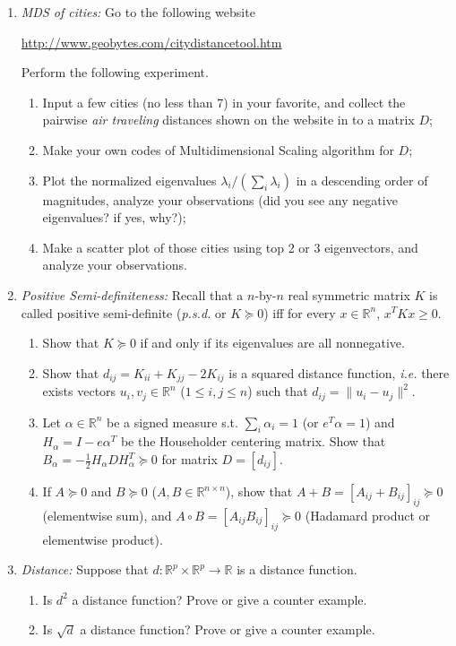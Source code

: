 \documentclass[11pt]{article}
\def\R{{\mathbb R}}
\begin{document}
\begin{enumerate}
\item {\em MDS of cities:} Go to the following website

\url{http://www.geobytes.com/citydistancetool.htm}

Perform the following experiment. 
\begin{enumerate}
\item Input a few cities (no less than 7) in your favorite, and collect the pairwise \emph{air traveling} distances shown on the website in to a matrix $D$;
\item Make your own codes of Multidimensional Scaling algorithm for $D$;
\item Plot the normalized eigenvalues $\lambda_i / (\sum_i \lambda_i)$ in a descending order of magnitudes, analyze your observations (did you see any negative eigenvalues? if yes, why?);
\item Make a scatter plot of those cities using top 2 or 3 eigenvectors, and analyze your observations. 
\end{enumerate}



\item {\em Positive Semi-definiteness:} Recall that a $n$-by-$n$ real symmetric matrix $K$ is called positive semi-definite (\emph{p.s.d.} or $K\succeq 0$) iff for every $x\in \R^n$, $x^T K x\geq 0$. 
\begin{enumerate}
\item Show that $K\succeq 0$ if and only if its eigenvalues are all nonnegative.
\item Show that $d_{ij}=K_{ii} + K_{jj} - 2 K_{ij}$ is a squared distance function, \emph{i.e.} there exists vectors $u_i,v_j \in \R^n$ ($1\leq i,j \leq n$) such that $d_{ij} = \|u_i - u_j\|^2$. 
\item Let $\alpha\in \R^n$ be a signed measure s.t. $\sum_i \alpha_i = 1$ (or $e^T \alpha =1$) and $H_\alpha= I - e \alpha^T$ be the Householder centering matrix. Show that $B_\alpha= - \frac{1}{2} H_\alpha D H_\alpha^T\succeq 0$ for matrix $D=[d_{ij}]$. 
\item If $A\succeq 0$ and $B\succeq 0$ ($A,B\in \R^{n\times n}$), show that $A+B = [A_{ij} + B_{ij}]_{ij} \succeq 0$ (elementwise sum), and $A\circ B= [A_{ij} B_{ij}]_{ij} \succeq 0$ (Hadamard product or elementwise product).
\end{enumerate}

\item {\em Distance:} Suppose that $d: \R^p \times \R^p \to \R$ is a distance function. 
\begin{enumerate}
\item Is $d^2$ a distance function? Prove or give a counter example.
\item Is $\sqrt{d}$ a distance function? Prove or give a counter example.
\end{enumerate}




\end{enumerate}
\end{document}
